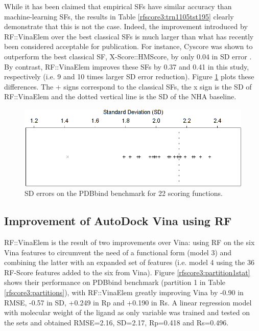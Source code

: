 While it has been claimed \citep{1372} that empirical SFs have similar accuracy than machine-learning SFs, the results in Table \ref{rfscore3:trn1105tst195} clearly demonstrate that this is not the case. Indeed, the improvement introduced by RF::VinaElem over the best classical SFs is much larger than what has recently been considered acceptable for publication. For instance, Cyscore was shown to outperform the best classical SF, X-Score::HMScore, by only 0.04 in SD error \citep{1372}. By contrast, RF::VinaElem improves these SFs by 0.37 and 0.41 in this study, respectively (i.e. 9 and 10 times larger SD error reduction). Figure \ref{rfscore3:StandardDeviations} plots these differences. The + signs correspond to the classical SFs, the x sign is the SD of RF::VinaElem and the dotted vertical line is the SD of the NHA baseline.

\begin{figure}
\centering
\includegraphics[width=\linewidth]{../rfscore3/StandardDeviations.png}
\caption{SD errors on the PDBbind benchmark for 22 scoring functions.}
\label{rfscore3:StandardDeviations}
\end{figure}

\subsection{Improvement of AutoDock Vina using RF}

RF::VinaElem is the result of two improvements over Vina: using RF on the six Vina features to circumvent the need of a functional form (model 3) and combining the latter with an expanded set of features (i.e. model 4 using the 36 RF-Score features added to the six from Vina). Figure \ref{rfscore3:partition1stat} shows their performance on PDBbind benchmark (partition 1 in Table \ref{rfscore3:partitions}), with RF::VinaElem greatly improving Vina by -0.90 in RMSE, -0.57 in SD, +0.249 in Rp and +0.190 in Rs. A linear regression model with molecular weight of the ligand as only variable was trained and tested on the sets and obtained RMSE=2.16, SD=2.17, Rp=0.418 and Rs=0.496.

